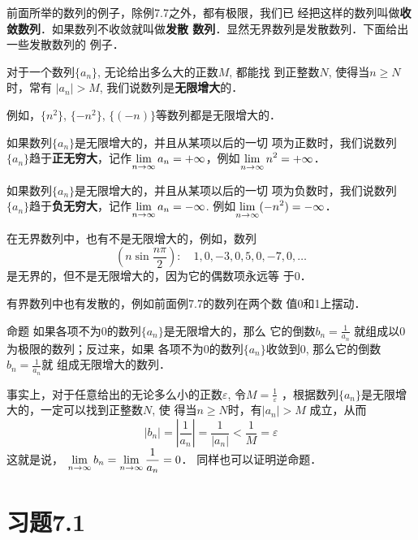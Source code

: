前面所举的数列的例子，除例7.7之外，都有极限，我们已
经把这样的数列叫做\textbf{收敛数列}．如果数列不收敛就叫做\textbf{发散
数列}．显然无界数列是发散数列．下面给出一些发散数列的
例子．

对于一个数列$\{a_n\}$, 无论给出多么大的正数$M$, 都能找
到正整数$N$, 使得当$n\ge N$时，常有
$|a_n|>M$, 
我们说数列是\textbf{无限增大}的．

例如，$\{n^2\}$, $\{-n^2\}$, $\{(-n)\}$等数列都是无限增大的．

如果数列$\{a_n\}$是无限增大的，并且从某项以后的一切
项为正数时，我们说数列$\{a_n\}$趋于\textbf{正无穷大}，记作$\displaystyle\lim_{n\to\infty}a_n=+\infty$，例如$\displaystyle\lim_{n\to\infty}n^2=+\infty$．

如果数列$\{a_n\}$是无限增大的，并且从某项以后的一切
项为负数时，我们说数列$\{a_n\}$趋于\textbf{负无穷大}，记作$\displaystyle\lim_{n\to\infty}a_n=-\infty$. 例如$\displaystyle\lim_{n\to\infty}(-n^2)=-\infty$．

在无界数列中，也有不是无限增大的，例如，数列
\[\left(n\sin\frac{n\pi}{2}\right):\quad 1,0,-3,0,5,0,-7,0,\ldots\]
是无界的，但不是无限增大的，因为它的偶数项永远等
于0．

有界数列中也有发散的，例如前面例7.7的数列在两个数
值0和1上摆动．

\begin{blk}{命题}
    如果各项不为0的数列$\{a_n\}$是无限增大的，那么
它的倒数$b_n=\frac{1}{a_n}$
就组成以0为极限的数列；反过来，如果
各项不为0的数列$\{a_n\}$收敛到0, 那么它的倒数$b_n=\frac{1}{a_n}$就
组成无限增大的数列．
\end{blk}
 
事实上，对于任意给出的无论多么小的正数$\varepsilon$, 令$M=\frac{1}{\varepsilon}$
，根据数列$\{a_n\}$是无限增大的，一定可以找到正整数$N$, 使
得当$n\ge N$时，有$|a_n|>M$
成立，从而
\[|b_n|=\left|\frac{1}{a_n}\right|=\frac{1}{|a_n|}<\frac{1}{M}=\varepsilon\]
这就是说，
$\displaystyle\lim_{n\to\infty}b_n=\displaystyle\lim_{n\to\infty}\dfrac{1}{a_n}=0$．
同样也可以证明逆命题．

\section*{习题7.1}

